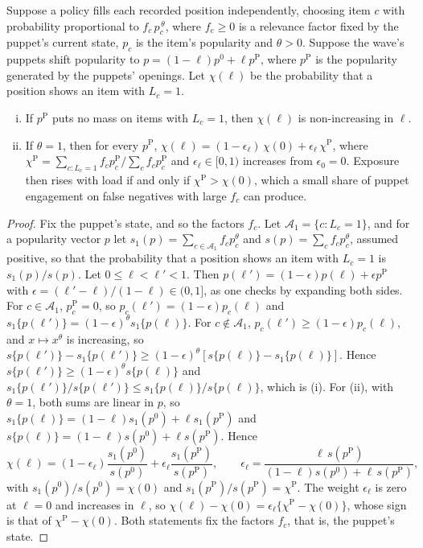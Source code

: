 \begin{proposition}\label{prop:int-direction}
Suppose a policy fills each recorded position independently, choosing item $c$ with probability proportional to $f_c\,p_c^{\,\theta}$, where $f_c\ge0$ is a relevance factor fixed by the puppet's current state, $p_c$ is the item's popularity and $\theta>0$. Suppose the wave's puppets shift popularity to $p=(1-\ell)p^0+\ell p^{\mathrm P}$, where $p^{\mathrm P}$ is the popularity generated by the puppets' openings. Let $\chi(\ell)$ be the probability that a position shows an item with $L_c=1$.
\begin{enumerate}[(i)]
  \item If $p^{\mathrm P}$ puts no mass on items with $L_c=1$, then $\chi(\ell)$ is non-increasing in $\ell$.
  \item If $\theta=1$, then for every $p^{\mathrm P}$, $\chi(\ell)=(1-\epsilon_\ell)\,\chi(0)+\epsilon_\ell\,\chi^{\mathrm P}$, where $\chi^{\mathrm P}=\sum_{c:L_c=1}f_cp^{\mathrm P}_c/\sum_cf_cp^{\mathrm P}_c$ and $\epsilon_\ell\in[0,1)$ increases from $\epsilon_0=0$. Exposure then rises with load if and only if $\chi^{\mathrm P}>\chi(0)$, which a small share of puppet engagement on false negatives with large $f_c$ can produce.
\end{enumerate}
\end{proposition}

\begin{proof}
Fix the puppet's state, and so the factors $f_c$. Let $\mathcal A_1=\{c:L_c=1\}$, and for a popularity vector $p$ let $s_1(p)=\sum_{c\in\mathcal A_1}f_cp_c^\theta$ and $s(p)=\sum_cf_cp_c^\theta$, assumed positive, so that the probability that a position shows an item with $L_c=1$ is $s_1(p)/s(p)$. Let $0\le\ell<\ell'<1$. Then $p(\ell')=(1-\epsilon)p(\ell)+\epsilon p^{\mathrm P}$ with $\epsilon=(\ell'-\ell)/(1-\ell)\in(0,1]$, as one checks by expanding both sides. For $c\in\mathcal A_1$, $p^{\mathrm P}_c=0$, so $p_c(\ell')=(1-\epsilon)p_c(\ell)$ and $s_1\{p(\ell')\}=(1-\epsilon)^\theta s_1\{p(\ell)\}$. For $c\notin\mathcal A_1$, $p_c(\ell')\ge(1-\epsilon)p_c(\ell)$, and $x\mapsto x^\theta$ is increasing, so $s\{p(\ell')\}-s_1\{p(\ell')\}\ge(1-\epsilon)^\theta[s\{p(\ell)\}-s_1\{p(\ell)\}]$. Hence $s\{p(\ell')\}\ge(1-\epsilon)^\theta s\{p(\ell)\}$ and $s_1\{p(\ell')\}/s\{p(\ell')\}\le s_1\{p(\ell)\}/s\{p(\ell)\}$, which is (i). For (ii), with $\theta=1$, both sums are linear in $p$, so $s_1\{p(\ell)\}=(1-\ell)s_1(p^0)+\ell s_1(p^{\mathrm P})$ and $s\{p(\ell)\}=(1-\ell)s(p^0)+\ell s(p^{\mathrm P})$. Hence
\[
  \chi(\ell)=(1-\epsilon_\ell)\frac{s_1(p^0)}{s(p^0)}+\epsilon_\ell\frac{s_1(p^{\mathrm P})}{s(p^{\mathrm P})},\qquad \epsilon_\ell=\frac{\ell\,s(p^{\mathrm P})}{(1-\ell)s(p^0)+\ell\,s(p^{\mathrm P})},
\]
with $s_1(p^0)/s(p^0)=\chi(0)$ and $s_1(p^{\mathrm P})/s(p^{\mathrm P})=\chi^{\mathrm P}$. The weight $\epsilon_\ell$ is zero at $\ell=0$ and increases in $\ell$, so $\chi(\ell)-\chi(0)=\epsilon_\ell\{\chi^{\mathrm P}-\chi(0)\}$, whose sign is that of $\chi^{\mathrm P}-\chi(0)$. Both statements fix the factors $f_c$, that is, the puppet's state.
\end{proof}

